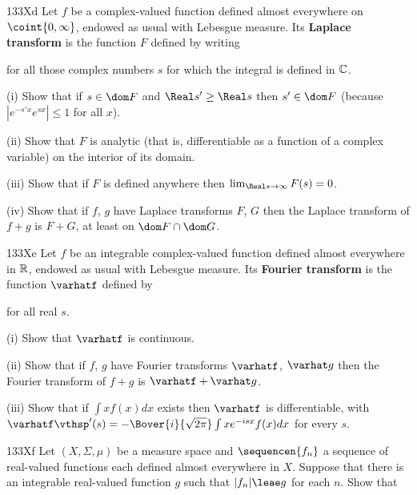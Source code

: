 {\sqheader 133Xd Let $f$ be a complex-valued function defined 
almost everywhere 
on $\coint{0,\infty}$, endowed as usual with Lebesgue measure.   Its 
{\bf Laplace transform} is the function $F$ defined by writing 
      
      
\noindent for all those complex numbers $s$ for which the integral is 
defined in $\Bbb C$. 
      
\quad(i) Show that if $s\in\dom F$ and $\Real s'\ge\Real s$ then 
$s'\in\dom F$ (because $|e^{-s'x}e^{sx}|\le 1$ for all $x$). 
      
\quad(ii) Show that $F$ is analytic (that is, differentiable as a 
function of a complex variable) on the interior of its domain. 
      
\quad(iii) Show that if $F$ is defined anywhere then $\lim_{\Real 
s\to\infty}F(s)=0$. 
      
\quad(iv) Show that if $f$, $g$ have Laplace transforms $F$, $G$ then 
the Laplace transform of $f+g$ is $F+G$, at least on $\dom F\cap \dom 
G$. 
      
\sqheader 133Xe Let $f$ be an integrable complex-valued function 
defined almost everywhere in $\Bbb R$, endowed as usual with Lebesgue 
measure.   Its {\bf Fourier transform} is the function $\varhatf$ 
defined by 
      
      
\noindent for all real $s$. 
      
\quad(i) Show that $\varhatf$ is continuous.    
      
\quad(ii) Show that if $f$, $g$ have Fourier transforms $\varhatf$, 
$\varhat g$ then the Fourier transform of $f+g$ is $\varhatf+\varhat g$. 
      
\quad(iii) Show that if $\int xf(x)dx$ exists then $\varhatf$ is 
differentiable, with 
$\varhatf\vthsp'(s)=-\Bover{i}{\sqrt{2\pi}}\int xe^{-isx}f(x)dx$ for 
every $s$. 
      
\spheader 133Xf Let $(X,\Sigma,\mu)$ be a measure space and 
$\sequencen{f_n}$ a sequence of real-valued functions each defined 
almost everywhere in $X$.   Suppose that there is an integrable 
real-valued function $g$ such that $|f_n|\leae g$ for each $n$. 
Show that 
      
}
